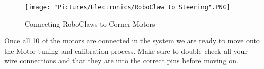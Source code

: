 \documentclass[12pt]{article}
\begin{document}
\begin{figure}[H]
 	\centering
	\texttt{[image: "Pictures/Electronics/RoboClaw to Steering".PNG]}
 	\caption{Connecting RoboClaws to Corner Motors}
	\label{RC to Steering}
\end{figure}

Once all 10 of the motors are connected in the system we are ready to move onto the Motor tuning and calibration process. Make sure to double check all your wire connections and that they are into the correct pins before moving on. 
\end{document}
